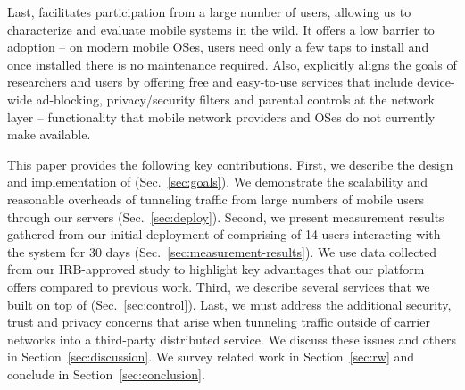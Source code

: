 Last, \meddle facilitates participation from a large number of users, allowing 
us to characterize and evaluate mobile systems in the wild. It offers a low barrier to adoption -- 
on modern mobile OSes, users need only a few taps to install \meddle and 
once installed there is no maintenance required. Also, \meddle explicitly aligns the goals of researchers 
and users by offering free and easy-to-use services that include device-wide
ad-blocking, privacy/security filters and parental controls at the
network layer -- functionality that mobile network providers and OSes do not
currently make available. 

This paper provides the following key contributions. First, we describe the 
design and implementation of \meddle (Sec.~\ref{sec:goals}). We demonstrate the scalability and reasonable overheads of 
tunneling traffic from large numbers of mobile users through our servers (Sec.~\ref{sec:deploy}). 
Second, we present measurement results gathered from our initial deployment of \meddle  
comprising of 14 users interacting with the system for 30 days (Sec.~\ref{sec:measurement-results}). We use data collected from 
our IRB-approved study to highlight key advantages that our platform 
offers compared to previous work. Third, we describe several 
services that we built on top of \meddle (Sec.~\ref{sec:control}). Last, we must address the
additional security, trust and privacy concerns that arise when
tunneling traffic outside of carrier networks into a third-party
distributed service. We discuss these issues and others in
Section~\ref{sec:discussion}. We survey related work in Section~\ref{sec:rw} and 
conclude in Section~\ref{sec:conclusion}.


